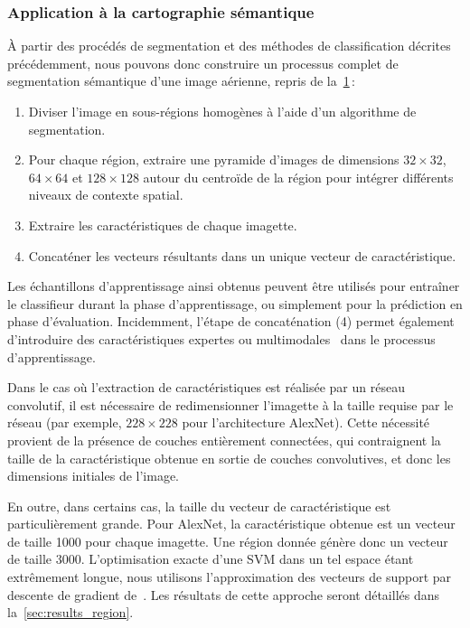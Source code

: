 \subsubsection{Application à la cartographie sémantique}

\begin{figure}[t]
\resizebox{\textwidth}{!}{%

}
\label{fig:framework}
\end{figure}

À partir des procédés de segmentation et des méthodes de classification décrites précédemment, nous pouvons donc construire un processus complet de segmentation sémantique d'une image aérienne, repris de la~\cref{fig:framework}\,:
\begin{enumerate}
    \item Diviser l'image en sous-régions homogènes à l'aide d'un algorithme de segmentation.
    \item Pour chaque région, extraire une pyramide d'images de dimensions $32\times32$, $64\times64$ et $128\times128$ autour du centroïde de la région pour intégrer différents niveaux de contexte spatial.
    \item Extraire les caractéristiques de chaque imagette.
    \item Concaténer les vecteurs résultants dans un unique vecteur de caractéristique.
\end{enumerate}

Les échantillons d'apprentissage ainsi obtenus peuvent être utilisés pour entraîner le classifieur durant la phase d'apprentissage, ou simplement pour la prédiction en phase d'évaluation. Incidemment, l'étape de concaténation (4) permet également d'introduire des caractéristiques expertes ou multimodales~\cite{lagrange_benchmarking_2015} dans le processus d'apprentissage.

Dans le cas où l'extraction de caractéristiques est réalisée par un réseau convolutif, il est nécessaire de redimensionner l'imagette à la taille requise par le réseau (par exemple, $228\times228$ pour l'architecture \gls{AlexNet}). Cette nécessité provient de la présence de couches entièrement connectées, qui contraignent la taille de la caractéristique obtenue en sortie de couches convolutives, et donc les dimensions initiales de l'image.

En outre, dans certains cas, la taille du vecteur de caractéristique est particulièrement grande. Pour AlexNet, la caractéristique obtenue est un vecteur de taille \num{1000} pour chaque imagette. Une région donnée génère donc un vecteur de taille \num{3000}. L'optimisation exacte d'une \gls{SVM} dans un tel espace étant extrêmement longue, nous utilisons l'approximation des vecteurs de support par descente de gradient de~\citet{bottou_large-scale_2010}. Les résultats de cette approche seront détaillés dans la~\cref{sec:results_region}.

